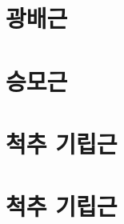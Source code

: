 \documentclass[12pt, a4paper, oneside]{book}
\let\stdsection\section
\renewcommand\section{\newpage\stdsection}
\begin{document}
		\section{광배근}

		\section{승모근}


		\section{척추 기립근}


		\section{척추 기립근}
\end{document}
